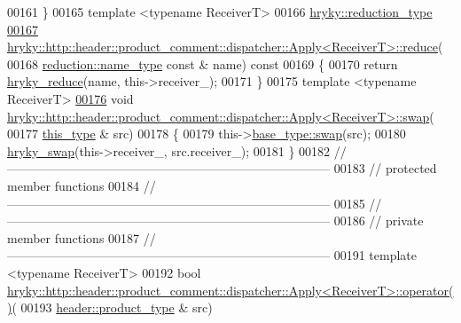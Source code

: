 \begin{DoxyCode}
00161 \}
00165 \textcolor{keyword}{template} <\textcolor{keyword}{typename} ReceiverT>
00166 \hyperlink{classhryky_1_1_intrusive_ptr}{hryky::reduction_type} 
\hypertarget{http__header__product__comment__dispatcher__apply_8h_source_l00167}{}\hyperlink{classhryky_1_1http_1_1header_1_1product__comment_1_1dispatcher_1_1_apply_a4842920d454b2bd980997b797bc437f0}{00167} \hyperlink{namespacehryky_1_1http_a08fc36a78a8e2908140fcd102829a566}{hryky::http::header::product_comment::dispatcher::Apply<ReceiverT>::reduce}(
00168     \hyperlink{classhryky_1_1reduction_1_1_string}{reduction::name_type} \textcolor{keyword}{const} & name)\textcolor{keyword}{ const}
00169 \textcolor{keyword}{}\{
00170     \textcolor{keywordflow}{return} \hyperlink{reduction__common_8h_afc72326c9900838c5db40438318794dd}{hryky_reduce}(name, this->receiver\_);
00171 \}
00175 \textcolor{keyword}{template} <\textcolor{keyword}{typename} ReceiverT>
\hypertarget{http__header__product__comment__dispatcher__apply_8h_source_l00176}{}\hyperlink{classhryky_1_1http_1_1header_1_1product__comment_1_1dispatcher_1_1_apply_aa32d5970a36b3391346febd126bb0287}{00176} \textcolor{keywordtype}{void} \hyperlink{namespacehryky_1_1http_a38e62595ad532d18fbc65ceb61973aec}{hryky::http::header::product_comment::dispatcher::Apply<ReceiverT>::swap}(
00177     \hyperlink{classhryky_1_1http_1_1header_1_1product__comment_1_1dispatcher_1_1_apply}{this_type} & src)
00178 \{
00179     this->\hyperlink{namespacehryky_1_1http_a38e62595ad532d18fbc65ceb61973aec}{base_type::swap}(src);
00180     \hyperlink{namespacehryky_add9c1c1fdfda07cd47bcb7c16d3a823a}{hryky_swap}(this->receiver\_, src.receiver\_);
00181 \}
00182 \textcolor{comment}{//
      ------------------------------------------------------------------------------}
00183 \textcolor{comment}{// protected member functions}
00184 \textcolor{comment}{//
      ------------------------------------------------------------------------------}
00185 \textcolor{comment}{//
      ------------------------------------------------------------------------------}
00186 \textcolor{comment}{// private member functions}
00187 \textcolor{comment}{//
      ------------------------------------------------------------------------------}
00191 \textcolor{comment}{}\textcolor{keyword}{template} <\textcolor{keyword}{typename} ReceiverT>
00192 \textcolor{keywordtype}{bool} 
      \hyperlink{classhryky_1_1http_1_1header_1_1product__comment_1_1dispatcher_1_1_apply}{hryky::http::header::product_comment::dispatcher::Apply<ReceiverT>::operator()}(
00193     \hyperlink{classhryky_1_1http_1_1header_1_1product_1_1_entity}{header::product_type} & src)

\end{DoxyCode}
